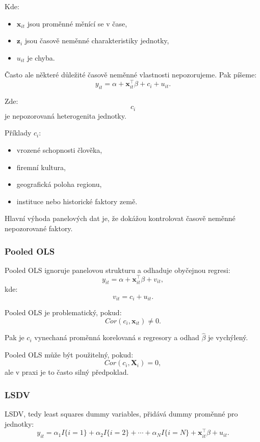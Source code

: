 Kde:
\begin{itemize}
    \item $\mathbf x_{it}$ jsou proměnné měnící se v čase,
    \item $\mathbf z_i$ jsou časově neměnné charakteristiky jednotky,
    \item $u_{it}$ je chyba.
\end{itemize}

Často ale některé důležité časově neměnné vlastnosti nepozorujeme. Pak píšeme:
\[
    y_{it}
    =
    \alpha
    +
    \mathbf x_{it}^\top\beta
    +
    c_i
    +
    u_{it}.
\]

Zde:
\[
    c_i
\]
je nepozorovaná heterogenita jednotky.

Příklady $c_i$:
\begin{itemize}
    \item vrozené schopnosti člověka,
    \item firemní kultura,
    \item geografická poloha regionu,
    \item instituce nebo historické faktory země.
\end{itemize}

Hlavní výhoda panelových dat je, že dokážou kontrolovat časově neměnné nepozorované faktory.

\subsubsection{Pooled OLS}

Pooled OLS ignoruje panelovou strukturu a odhaduje obyčejnou regresi:
\[
    y_{it}=\alpha+\mathbf x_{it}^\top\beta+v_{it},
\]
kde:
\[
    v_{it}=c_i+u_{it}.
\]

Pooled OLS je problematický, pokud:
\[
    Cor(c_i,\mathbf x_{it})\neq 0.
\]

Pak je $c_i$ vynechaná proměnná korelovaná s regresory a odhad $\hat\beta$ je vychýlený.

Pooled OLS může být použitelný, pokud:
\[
    Cor(c_i,\mathbf X_i)=0,
\]
ale v praxi je to často silný předpoklad.

\subsubsection{LSDV}

LSDV, tedy least squares dummy variables, přidává dummy proměnné pro jednotky:
\[
    y_{it}
    =
    \alpha_1I\{i=1\}
    +
    \alpha_2I\{i=2\}
    +\cdots+
    \alpha_NI\{i=N\}
    +
    \mathbf x_{it}^\top\beta
    +
    u_{it}.
\]

